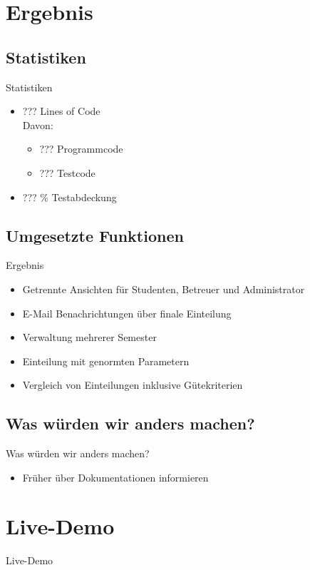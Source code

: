 \documentclass[18pt]{beamer}
\begin{document}
\section{Ergebnis}
\subsection{Statistiken}
\begin{frame}{Statistiken}
\begin{itemize}
\item ??? Lines of Code \\ Davon:
\begin{itemize}
\item ??? Programmcode
\item ??? Testcode
\end{itemize}
\item ??? \% Testabdeckung
\end{itemize} 
\end{frame}

\subsection{Umgesetzte Funktionen}
\begin{frame}{Ergebnis} 
\begin{itemize}
 \item Getrennte Ansichten für Studenten, Betreuer und Administrator
 \item E-Mail Benachrichtungen über finale Einteilung
 \item Verwaltung mehrerer Semester
 \item Einteilung mit genormten Parametern
 \item Vergleich von Einteilungen inklusive Gütekriterien
\end{itemize}
\end{frame}

\subsection{Was würden wir anders machen?}
\begin{frame}{Was würden wir anders machen?}
 \begin{itemize}
  \item Früher über Dokumentationen informieren
 \end{itemize}

\end{frame}


\section{Live-Demo}
\begin{frame}
 \begin{center}
  \Huge Live-Demo
 \end{center}
\end{frame}
\end{document}
